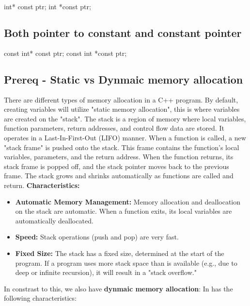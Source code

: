 \documentclass{report}
\begin{document}
    \begin{cppcode}
int* const ptr;
int *const ptr;
    \end{cppcode}
    

    \bigbreak \noindent 
    \subsection{Both pointer to constant and constant pointer}
    \bigbreak \noindent 
    
    \begin{cppcode}
const int* const ptr;
const int *const ptr;
    \end{cppcode}
    

    \bigbreak \noindent 
    \subsection{Prereq - Static vs Dynmaic memory allocation}
    \bigbreak \noindent 
    There are different types of memory allocation in a C++ program. By default, creating variables will utilize "static memory allocation", this is where variables are created on the "stack". The stack is a region of memory where local variables, function parameters, return addresses, and control flow data are stored. It operates in a Last-In-First-Out (LIFO) manner.
    \bigbreak \noindent 
    When a function is called, a new "stack frame" is pushed onto the stack. This frame contains the function's local variables, parameters, and the return address.
    When the function returns, its stack frame is popped off, and the stack pointer moves back to the previous frame.
    The stack grows and shrinks automatically as functions are called and return.
    \bigbreak \noindent 
    \textbf{Characteristics:}
    \begin{itemize}
        \item \textbf{Automatic Memory Management:} Memory allocation and deallocation on the stack are automatic. When a function exits, its local variables are automatically deallocated.
        \item \textbf{Speed:} Stack operations (push and pop) are very fast.
        \item \textbf{Fixed Size:} The stack has a fixed size, determined at the start of the program. If a program uses more stack space than is available (e.g., due to deep or infinite recursion), it will result in a "stack overflow."
    \end{itemize}
    \bigbreak \noindent 
    In constrast to this, we also have \textbf{dynmaic memory allocation}: In has the following characteristics:
\end{document}
